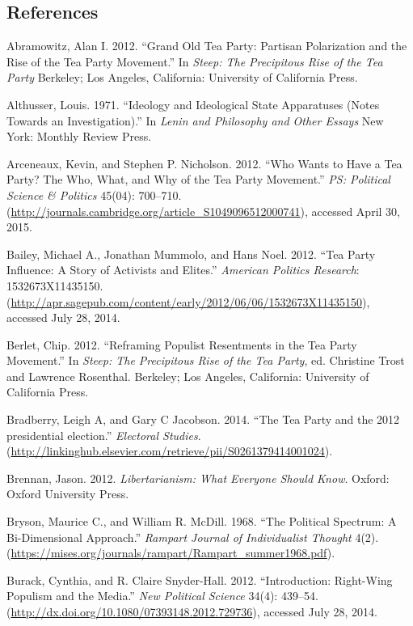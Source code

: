 \documentclass[12pt,]{article}
\begin{document}
\clearpage

\subsection*{References}\label{references}

Abramowitz, Alan I. 2012. ``Grand Old Tea Party: Partisan Polarization
and the Rise of the Tea Party Movement.'' In \emph{Steep: The
Precipitous Rise of the Tea Party} Berkeley; Los Angeles, California:
University of California Press.

Althusser, Louis. 1971. ``Ideology and Ideological State Apparatuses
(Notes Towards an Investigation).'' In \emph{Lenin and Philosophy and
Other Essays} New York: Monthly Review Press.

Arceneaux, Kevin, and Stephen P. Nicholson. 2012. ``Who Wants to Have a
Tea Party? The Who, What, and Why of the Tea Party Movement.'' \emph{PS:
Political Science \& Politics} 45(04): 700--710.
(\url{http://journals.cambridge.org/article_S1049096512000741}),
accessed April 30, 2015.

Bailey, Michael A., Jonathan Mummolo, and Hans Noel. 2012. ``Tea Party
Influence: A Story of Activists and Elites.'' \emph{American Politics
Research}: 1532673X11435150.
(\url{http://apr.sagepub.com/content/early/2012/06/06/1532673X11435150}),
accessed July 28, 2014.

Berlet, Chip. 2012. ``Reframing Populist Resentments in the Tea Party
Movement.'' In \emph{Steep: The Precipitous Rise of the Tea Party}, ed.
Christine Trost and Lawrence Rosenthal. Berkeley; Los Angeles,
California: University of California Press.

Bradberry, Leigh A, and Gary C Jacobson. 2014. ``The Tea Party and the
2012 presidential election.'' \emph{Electoral Studies}.
(\url{http://linkinghub.elsevier.com/retrieve/pii/S0261379414001024}).

Brennan, Jason. 2012. \emph{Libertarianism: What Everyone Should Know}.
Oxford: Oxford University Press.

Bryson, Maurice C., and William R. McDill. 1968. ``The Political
Spectrum: A Bi-Dimensional Approach.'' \emph{Rampart Journal of
Individualist Thought} 4(2).
(\url{https://mises.org/journals/rampart/Rampart_summer1968.pdf}).

Burack, Cynthia, and R. Claire Snyder-Hall. 2012. ``Introduction:
Right-Wing Populism and the Media.'' \emph{New Political Science} 34(4):
439--54. (\url{http://dx.doi.org/10.1080/07393148.2012.729736}),
accessed July 28, 2014.
\end{document}
